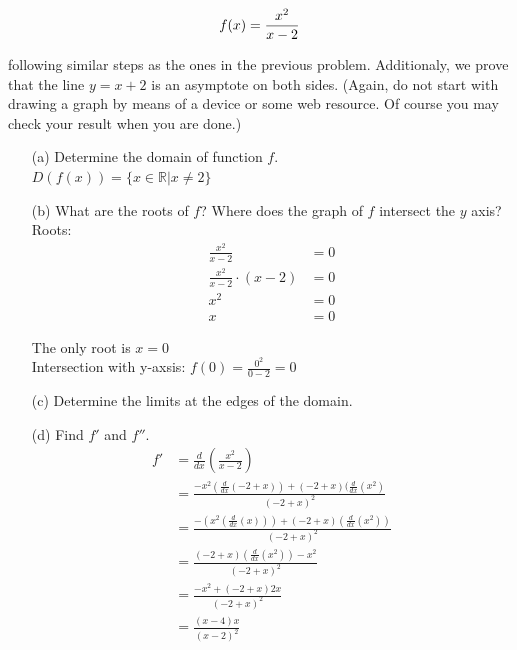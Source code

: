 \documentclass[a4paper]{article}
\begin{document}
\begin{enumerate}
\begin{equation}
	f(x) = \frac{x^2}{x - 2} \notag
\end{equation}
	
following similar steps as the ones in the previous problem. Additionaly, we prove that the line $y = x + 2$ is an asymptote on both sides. (Again, do not start with drawing a graph by means of a device or some web resource. Of course you may check your result when you are done.)


	\begin{enumerate}
		\item[(a)] Determine the domain of function $f$.\\
		
$D(f(x)) = \{ x \in \mathbb{R} | x \neq 2\}$\\		
		
		
		\item[(b)] What are the roots of $f$? Where does the graph of $f$ intersect the $y$ axis?\\
		
		
Roots:\\

\begin{align*}
	\frac{x^2}{x - 2} &= 0\\
	\frac{x^2}{x - 2}  \cdot (x - 2) &= 0\\
	x^2 &= 0\\
	x &= 0
\end{align*}	
		
The only root is $x = 0$\\
		
		
Intersection with y-axsis: $f(0) = \frac{0^2}{0 - 2} = 0$\\

		
		\item[(c)] Determine the limits at the edges of the domain.\\
		
		\item[(d)] Find $f'$ and $f''$.\\
		

\begin{align*}
	f' &= \frac{d}{dx}(\frac{x^2}{x - 2})\\
	&= \frac{-x^2(\frac{d}{dx}(-2+x)) + (-2 + x)(\frac{d}{dx}(x^2)}{(-2+x)^2}\\
	&= \frac{-(x^2 (\frac{d}{dx}(x))) + (-2 + x)(\frac{d}{dx}(x^2))}{(-2 + x)^2}\\
	&= \frac{(-2 + x)(\frac{d}{dx}(x^2)) - x^2}{(-2 + x)^2}\\
	&= \frac{-x^2 + (-2 + x) 2x}{(-2 + x)^2}\\
	&= \frac{(x-4)x}{(x - 2)^2}
\end{align*}		
		

\end{enumerate}
\end{enumerate}
\end{document}
